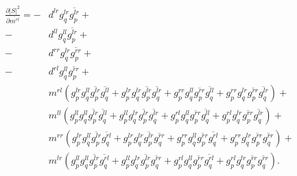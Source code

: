 \documentclass[12pt]{article}
\begin{document}
\begin{equation}
\begin{split}
\frac{\partial |S|^2}{\partial \overline{m^{rl}}} = 
	- &d^{lr} g_q^{lr} \overline{g_p^{lr}}+\\
	- &d^{ll} g_q^{ll} \overline{g_p^{lr}}+\\
	- &d^{rr} g_q^{lr} \overline{g_p^{rr}}+\\
	- &d^{rl} g_q^{ll} \overline{g_p^{rr}}+\\
	&m^{rl} \left(g_p^{lr} g_q^{ll} \overline{g_p^{lr}} \overline{g_q^{ll}} + g_p^{lr} g_q^{lr} \overline{g_p^{lr}} \overline{g_q^{lr}} + g_p^{rr} g_q^{ll} \overline{g_p^{rr}} \overline{g_q^{ll}} + g_p^{rr} g_q^{lr} \overline{g_p^{rr}} \overline{g_q^{lr}}\right)+\\
	&m^{ll} \left(g_p^{ll} g_q^{ll} \overline{g_p^{lr}} \overline{g_q^{ll}} + g_p^{ll} g_q^{lr} \overline{g_p^{lr}} \overline{g_q^{lr}} + g_p^{rl} g_q^{ll} \overline{g_p^{rr}} \overline{g_q^{ll}} + g_p^{rl} g_q^{lr} \overline{g_p^{rr}} \overline{g_q^{lr}}\right)+\\
	&m^{rr} \left(g_p^{lr} g_q^{ll} \overline{g_p^{lr}} \overline{g_q^{rl}} + g_p^{lr} g_q^{lr} \overline{g_p^{lr}} \overline{g_q^{rr}} + g_p^{rr} g_q^{ll} \overline{g_p^{rr}} \overline{g_q^{rl}} + g_p^{rr} g_q^{lr} \overline{g_p^{rr}} \overline{g_q^{rr}}\right)+\\
	&m^{lr} \left(g_p^{ll} g_q^{ll} \overline{g_p^{lr}} \overline{g_q^{rl}} + g_p^{ll} g_q^{lr} \overline{g_p^{lr}} \overline{g_q^{rr}} + g_p^{rl} g_q^{ll} \overline{g_p^{rr}} \overline{g_q^{rl}} + g_p^{rl} g_q^{lr} \overline{g_p^{rr}} \overline{g_q^{rr}}\right).
\end{split}
\end{equation}
\end{document}
